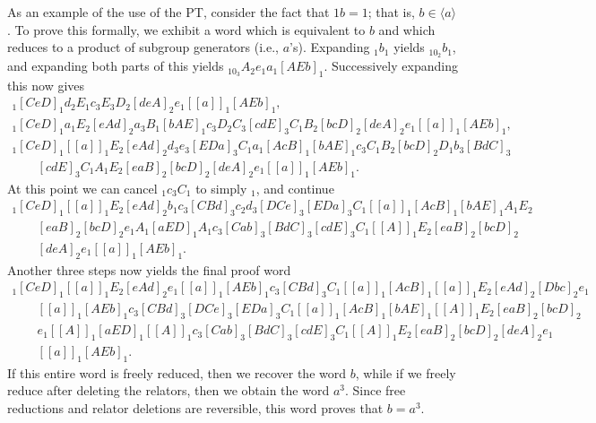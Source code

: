 As an example of the use of the PT, consider the fact that $1b=1$; that
  is, $b \in \langle a \rangle$.
To prove this formally, we exhibit a word which is equivalent to $b$ and
  which reduces to a product of subgroup generators (i.e., $a$'s).
Expanding $_1b_1$ yields $_10_2b_1$, and expanding both parts of this
  yields $_10_3 A_2 e_1 a_1[AEb]_1$.
Successively expanding this now gives
  $$\begin{array}{l}
  _1[CeD]_1 d_2 E_1 c_3 E_3 D_2[deA]_2 e_1 [[a]]_1 [AEb]_1 , \\
  _1[CeD]_1 a_1E_2[eAd]_2 a_3B_1[bAE]_1 c_3 D_2C_3[cdE]_3 C_1B_2[bcD]_2
    [deA]_2 e_1 [[a]]_1 [AEb]_1 , \\
  _1[CeD]_1 [[a]]_1 E_2[eAd]_2 d_3e_3[EDa]_3 C_1a_1[AcB]_1 [bAE]_1 c_3
    C_1B_2[bcD]_2 D_1b_3[BdC]_3  \\
    \quad\quad [cdE]_3 C_1 A_1E_2[eaB]_2 [bcD]_2 [deA]_2 e_1 [[a]]_1
    [AEb]_1 .
  \end{array}$$
At this point we can cancel $_1c_3C_1$ to simply $_1$, and continue
  $$\begin{array}{l}
  _1[CeD]_1 [[a]]_1 E_2[eAd]_2 b_1c_3[CBd]_3 c_2d_3[DCe]_3 [EDa]_3 C_1
    [[a]]_1 [AcB]_1 [bAE]_1 A_1E_2 \\
    \quad\quad [eaB]_2 [bcD]_2 e_1A_1[aED]_1 A_1c_3[Cab]_3 [BdC]_3 
    [cdE]_3 C_1 [[A]]_1 E_2[eaB]_2 [bcD]_2 \\
    \quad\quad [deA]_2 e_1 [[a]]_1 [AEb]_1 .
  \end{array}$$
Another three steps now yields the final proof word
  $$\begin{array}{l}
  _1[CeD]_1[[a]]_1E_2[eAd]_2e_1[[a]]_1[AEb]_1c_3[CBd]_3C_1[[a]]_1[AcB]_1
    [[a]]_1E_2[eAd]_2[Dbc]_2e_1 \\
    \quad\quad [[a]]_1[AEb]_1c_3[CBd]_3[DCe]_3[EDa]_3C_1
    [[a]]_1[AcB]_1[bAE]_1[[A]]_1E_2[eaB]_2[bcD]_2 \\
    \quad\quad e_1[[A]]_1[aED]_1[[A]]_1c_3[Cab]_3[BdC]_3[cdE]_3C_1[[A]]_1
    E_2[eaB]_2[bcD]_2[deA]_2e_1 \\
    \quad\quad [[a]]_1[AEb]_1 .
  \end{array}$$
If this entire word is freely reduced, then we recover the word $b$, while
  if we freely reduce after deleting the relators, then we obtain the
  word $a^3$\kern-1.5pt.
Since free reductions and relator deletions are reversible, this word 
  proves that $b=a^3$\kern-1.5pt.

